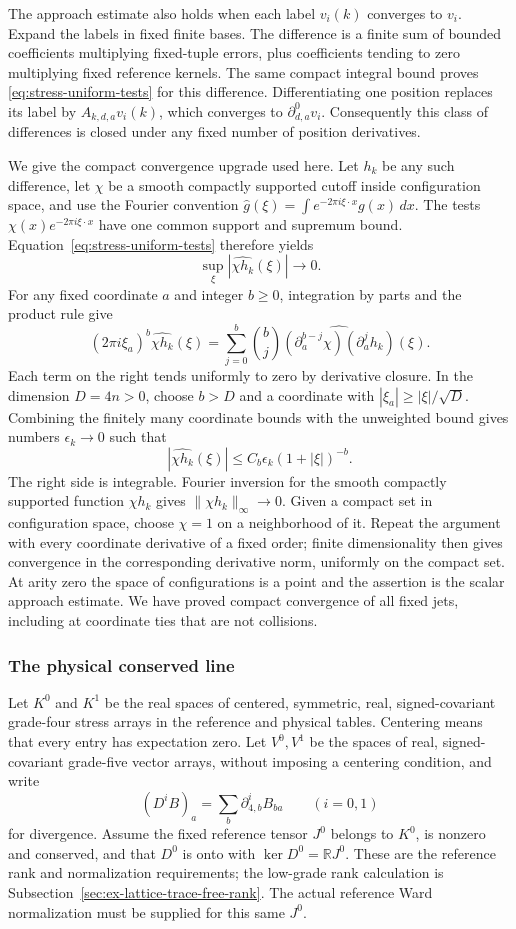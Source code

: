 The approach estimate also holds when each label $v_i(k)$ converges to
$v_i$. Expand the labels in fixed finite bases. The difference is a
finite sum of bounded coefficients multiplying fixed-tuple errors, plus
coefficients tending to zero multiplying fixed reference kernels.
The same compact integral bound proves
\eqref{eq:stress-uniform-tests} for this difference. Differentiating
one position replaces its label by $A_{k,d,a}v_i(k)$, which converges
to $\partial^0_{d,a}v_i$. Consequently this class of differences is
closed under any fixed number of position derivatives.

We give the compact convergence upgrade used here. Let $h_k$ be any
such difference, let $\chi$ be a smooth compactly supported cutoff
inside configuration space, and use the Fourier convention
$\widehat g(\xi)=\int e^{-2\pi i\xi\cdot x}g(x)\,dx$.
The tests $\chi(x)e^{-2\pi i\xi\cdot x}$ have one common support and
supremum bound. Equation~\eqref{eq:stress-uniform-tests} therefore yields
\[
       \sup_\xi|\widehat{\chi h_k}(\xi)|\longrightarrow0.
\]
For any fixed coordinate $a$ and integer $b\ge0$, integration by
parts and the product rule give
\[
 (2\pi i\xi_a)^b\widehat{\chi h_k}(\xi)
 =\sum_{j=0}^b {b\choose j}
       \widehat{(\partial_a^{b-j}\chi)(\partial_a^jh_k)}(\xi).
\]
Each term on the right tends uniformly to zero by derivative closure.
In the dimension $D=4n>0$, choose $b>D$ and a coordinate with
$|\xi_a|\ge|\xi|/\sqrt D$. Combining the finitely many coordinate
bounds with the unweighted bound gives numbers $\epsilon_k\to0$ such
that
\[
 |\widehat{\chi h_k}(\xi)|
       \le C_b\epsilon_k(1+|\xi|)^{-b}.
\]
The right side is integrable. Fourier inversion for the smooth compactly
supported function $\chi h_k$ gives
$\|\chi h_k\|_\infty\to0$. Given a compact set in configuration
space, choose $\chi=1$ on a neighborhood of it. Repeat the argument
with every coordinate derivative of a fixed order; finite dimensionality
then gives convergence in the corresponding derivative norm, uniformly
on the compact set. At arity zero the space of configurations is a
point and the assertion is the scalar approach estimate. We have proved
compact convergence of all fixed jets, including at coordinate ties that
are not collisions.

\subsubsection{The physical conserved line}
Let $K^0$ and $K^1$ be the real spaces of centered, symmetric,
real, signed-covariant grade-four stress arrays in the reference and
physical tables. Centering means that every entry has expectation zero.
Let $V^0,V^1$ be the spaces of real, signed-covariant grade-five vector
arrays, without imposing a centering condition, and
write
\[
 (D^iB)_a=\sum_b\partial^i_{4,b}B_{ba}\qquad(i=0,1)
\]
for divergence. Assume the fixed reference tensor $J^0$ belongs to
$K^0$, is nonzero and conserved, and that $D^0$ is onto with
$\ker D^0=\mathbb R J^0$. These are the reference rank and
normalization requirements; the low-grade rank calculation is
Subsection~\ref{sec:ex-lattice-trace-free-rank}. The actual reference
Ward normalization must be supplied for this same $J^0$.

